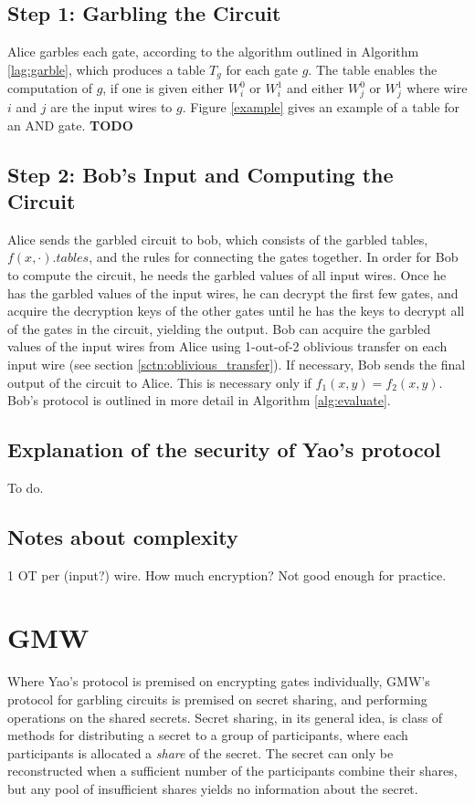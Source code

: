 \subsection{Step 1: Garbling the Circuit}
Alice garbles each gate, according to the algorithm outlined in Algorithm \ref{lag:garble}, which produces a table $T_g$ for each gate $g$.
The table enables the computation of $g$, if one is given either $W^0_i$ or $W^1_i$ and either $W^0_j$ or $W^1_j$ where wire $i$ and $j$ are the input wires to $g$.
Figure \ref{example} gives an example of a table for an AND gate. \textbf{TODO}

\subsection{Step 2: Bob's Input and Computing the Circuit}
Alice sends the garbled circuit to bob, which consists of the garbled tables, $f(x,\cdot).tables$, and the rules for connecting the gates together.
In order for Bob to compute the circuit, he needs the garbled values of all input wires.
Once he has the garbled values of the input wires, he can decrypt the first few gates, and acquire the decryption keys of the other gates until he has the keys to decrypt all of the gates in the circuit, yielding the output.
Bob can acquire the garbled values of the input wires from Alice using 1-out-of-2 oblivious transfer on each input wire (see section \ref{sctn:oblivious_transfer}).
If necessary, Bob sends the final output of the circuit to Alice. 
This is necessary only if $f_1(x,y) = f_2(x,y)$. 
Bob's protocol is outlined in more detail in Algorithm \ref{alg:evaluate}.

\subsection{Explanation of the security of Yao's protocol}
To do.

\subsection{Notes about complexity}
1 OT per (input?) wire.
How much encryption?
Not good enough for practice.

\section{GMW}
Where Yao's protocol is premised on encrypting gates individually, GMW's protocol for garbling circuits is premised on secret sharing, and performing operations on the shared secrets. 
Secret sharing, in its general idea, is class of methods for distributing a secret to a group of participants, where each participants is allocated a \textit{share} of the secret. 
The secret can only be reconstructed when a sufficient number of the participants combine their shares, but any pool of insufficient shares yields no information about the secret.

